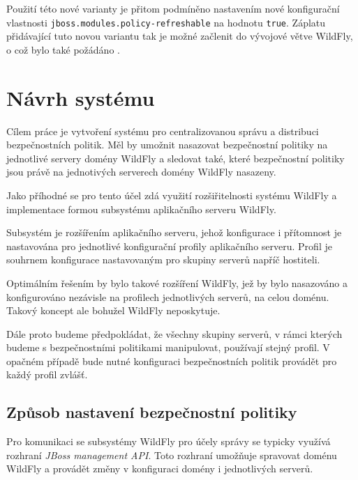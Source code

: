 Použití této nové varianty je přitom podmíněno nastavením nové konfigurační vlastnosti {\tt jboss.modules.policy-refreshable} na hodnotu {\tt true}.
Záplatu přidávající tuto novou variantu tak je možné začlenit do vývojové větve WildFly, o což bylo také požádáno \cite{jmPullRequest}.

\chapter{Návrh systému} \label{navrh}

Cílem práce je vytvoření systému pro centralizovanou správu a distribuci bezpečnostních politik. Měl by umožnit nasazovat bezpečnostní politiky na jednotlivé servery domény WildFly a sledovat také, které bezpečnostní politiky jsou právě na jednotivých serverech domény WildFly nasazeny.

Jako příhodné se pro tento účel zdá využití rozšiřitelnosti systému WildFly a implementace formou subsystému aplikačního serveru WildFly.

Subsystém je rozšířením aplikačního serveru, jehož konfigurace i přítomnost je nastavována pro jednotlivé konfigurační profily aplikačního serveru.
Profil je souhrnem konfigurace nastavovaným pro skupiny serverů napříč hostiteli.

Optimálním řešením by bylo takové rozšíření WildFly, jež by bylo nasazováno a konfigurováno nezávisle na profilech jednotlivých serverů, na celou doménu.
Takový koncept ale bohužel WildFly neposkytuje.

Dále proto budeme předpokládat, že všechny skupiny serverů, v rámci kterých budeme s bezpečnostními politikami manipulovat, používají stejný profil.
V opačném případě bude nutné konfiguraci bezpečnostních politik provádět pro každý profil zvlášť.

\section{Způsob nastavení bezpečnostní politiky} \label{zpusobNastaveniJBoss}

Pro komunikaci se subsystémy WildFly pro účely správy se typicky využívá rozhraní {\it JBoss management API}.
Toto rozhraní umožňuje spravovat doménu WildFly a provádět změny v konfiguraci domény i jednotlivých serverů.
\cite{jbossDetypedManagement}

